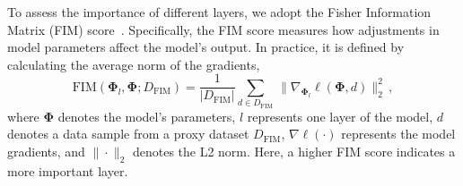 \documentclass[lettersize,journal]{IEEEtran}
\begin{document}
To assess the importance of different layers, we adopt the Fisher Information Matrix (FIM) score~\cite{weiss1984application}.
% 
Specifically, the FIM score measures how adjustments in model parameters affect the model's output. In practice, it is defined by calculating the average norm of the gradients,
\begin{equation}\label{eqn:FIM-definition}
\text{FIM}(\boldsymbol{\Phi}_l, \boldsymbol{\Phi}; D_\text{FIM}) = \frac{1}{|D_\text{FIM}|}\sum_{d\in D_\text{FIM}}\,\|\nabla_{\boldsymbol{\Phi}_l}\ell(\boldsymbol{\Phi}, d)\|^2_2\,,
\end{equation}
where $\boldsymbol{\Phi}$ denotes the model’s parameters, $l$ represents one layer of the model, $d$ denotes a data sample from a proxy dataset ${D_\text{FIM}}$, $\nabla\ell(\cdot)$ represents the model gradients, and $\|\cdot\|_2$ denotes the L2 norm.
Here, a higher FIM score indicates a more important layer. 
\end{document}
